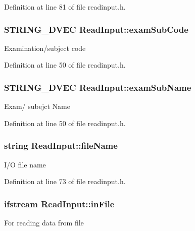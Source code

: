 \-Definition at line 81 of file readinput.\-h.

\hypertarget{classReadInput_a81eee5f7478e5d2d76afad814a6c4e3e}{
\subsubsection[{exam\-Sub\-Code}]{\setlength{\rightskip}{0pt plus 5cm}\-S\-T\-R\-I\-N\-G\-\_\-D\-V\-E\-C {\bf \-Read\-Input\-::exam\-Sub\-Code}}}\label{classReadInput_a81eee5f7478e5d2d76afad814a6c4e3e}
\-Examination/subject code 

\-Definition at line 50 of file readinput.\-h.

\hypertarget{classReadInput_a6ac62618d1b89d823230ae93c7b85c3b}{
\subsubsection[{exam\-Sub\-Name}]{\setlength{\rightskip}{0pt plus 5cm}\-S\-T\-R\-I\-N\-G\-\_\-D\-V\-E\-C {\bf \-Read\-Input\-::exam\-Sub\-Name}}}\label{classReadInput_a6ac62618d1b89d823230ae93c7b85c3b}
\-Exam/ subejct \-Name 

\-Definition at line 50 of file readinput.\-h.

\hypertarget{classReadInput_a834acf783052b5b2f129644b4accaadc}{
\subsubsection[{file\-Name}]{\setlength{\rightskip}{0pt plus 5cm}string {\bf \-Read\-Input\-::file\-Name}}}\label{classReadInput_a834acf783052b5b2f129644b4accaadc}
\-I/\-O file name 

\-Definition at line 73 of file readinput.\-h.

\hypertarget{classReadInput_afe0f493fcb2da1f644445501823fd0e2}{
\subsubsection[{in\-File}]{\setlength{\rightskip}{0pt plus 5cm}ifstream {\bf \-Read\-Input\-::in\-File}}}\label{classReadInput_afe0f493fcb2da1f644445501823fd0e2}
\-For reading data from file 

